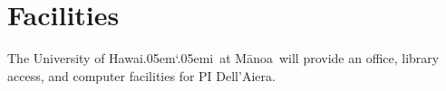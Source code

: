 \documentclass[11pt]{article}
\newcommand{\Manoa}{M\=anoa}
\newcommand{\Hawaii}{Hawai\kern.05em`\kern.05em\relax i}
\begin{document}
\section*{Facilities}

\noindent The University of \Hawaii~at \Manoa~will provide an office, library access, and computer facilities for PI Dell'Aiera.
\end{document}
